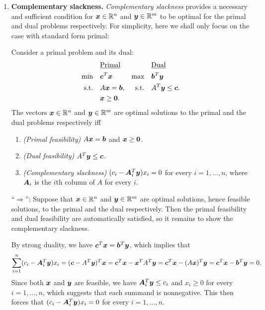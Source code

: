 \begin{enumerate}
\item\label{it:comp-slackness} \textbf{Complementary slackness.}
\emph{Complementary slackness} provides a necessary and sufficient condition
for \(\bm{x}\in\mathbb{R}^n\) and \(\bm{y}\in\mathbb{R}^m\) to be optimal for the primal and dual
problems respectively. For simplicity, here we shall only focus on the case
with standard form primal:
\begin{theorem}
\label{thm:optim-comp-slackness}
Consider a primal problem and its dual:
\begin{align*}
&\text{\underline{Primal}}&&\text{\underline{Dual}} \\
\text{min}\quad&\bm{c}^{T}\bm{x}&\text{max}\quad&\bm{b}^{T}\bm{y} \\
\text{s.t.}\quad&A\bm{x}=\bm{b},&\text{s.t.}\quad&A^{T}\bm{y}\le\bm{c}. \\
\quad&\bm{x}\ge\bm{0}.
\end{align*}
The vectors \(\bm{x}\in\mathbb{R}^n\) and \(\bm{y}\in\mathbb{R}^m\) are optimal solutions
to the primal and the dual problems respectively iff
\begin{enumerate}[label={(\arabic*)}]
\item \emph{(Primal feasibility)} \(A\bm{x}=\bm{b}\) and \(\bm{x}\ge\bm{0}\).
\item \emph{(Dual feasibility)} \(A^{T}\bm{y}\le\bm{c}\).
\item \emph{(Complementary slackness)} \((c_i-\bm{A}_i^{T}\bm{y})x_i=0\)
for every \(i=1,\dotsc,n\), where \(\bm{A}_i\) is the \(i\)th column of
\(A\) for every \(i\).
\end{enumerate}
\end{theorem}
\begin{pf}
``\(\Rightarrow\)'': Suppose that \(\bm{x}\in\mathbb{R}^n\) and \(\bm{y}\in\mathbb{R}^m\)
are optimal solutions, hence feasible solutions, to the primal and the dual
respectively.  Then the primal feasibility and dual feasibility are
automatically satisfied, so it remains to show the complementary slackness.

By strong duality, we have \(\bm{c}^{T}\bm{x}=\bm{b}^{T}\bm{y}\), which
implies that
\[
\sum_{i=1}^{n}(c_i-\bm{A}_i^{T}\bm{y})x_i
=(\bm{c}-A^{T}\bm{y})^{T}\bm{x}
=\bm{c}^{T}\bm{x}-\bm{x}^{T}A^{T}\bm{y}
=\bm{c}^{T}\bm{x}-(A\bm{x})^{T}\bm{y}
=\bm{c}^{T}\bm{x}-\bm{b}^{T}\bm{y}
=0.
\]
Since both \(\bm{x}\) and \(\bm{y}\) are feasible, we have
\(\bm{A}_i^{T}\bm{y}\le c_i\) and \(x_i\ge 0\) for every \(i=1,\dotsc,n\),
which suggests that each summand is nonnegative. This then forces that
\((c_i-\bm{A}_i^{T}\bm{y})x_i=0\) for every \(i=1,\dotsc,n\).


\end{pf}
\end{enumerate}
